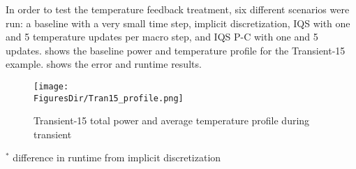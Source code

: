 In order to test the temperature feedback treatment, six different scenarios were run: a baseline with a very small time step, implicit discretization, IQS with one and 5 temperature updates per macro step, and IQS P-C with one and 5 updates.   shows the baseline power and temperature profile for the Transient-15 example.   shows the error and runtime results.

\begin{figure}[htbp!]
\centering
\texttt{[image: \\FiguresDir/Tran15\_profile.png]}
\caption{Transient-15 total power and average temperature profile during transient}
\label{fig:Tran15_profile}
\end{figure}

\begin{table}[htb]
\begin{center}
\end{center}
\vspace{-3mm}
$^*$ difference in runtime from implicit discretization 
\caption{Transient-15 Error and Runtime Results}
\label{tab:tran15}
\end{table}

